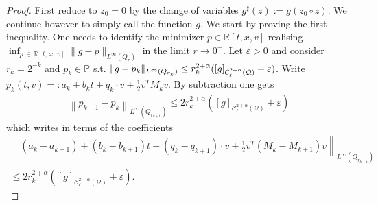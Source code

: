 \documentclass[10pt]{amsart}
\theoremstyle{definition}\newtheorem{defi}[theo]{Definition}\newtheorem{rema}[theo]{Remark}\newtheorem{exam}[theo]{Example}\newtheorem{exem}[theo]{Example}\newtheorem{nota}[theo]{Notation}
\newcommand{\R}{\mathbb{R}}
\newcommand{\bbP}{\mathbb{P}}
\newcommand{\cC}{\mathcal{C}}
\newcommand{\cQ}{\mathcal{Q}}
\newcommand*\eps{\varepsilon}
\begin{document}
\begin{proof}
First reduce to $z_0=0$ by the change of variables $g^\sharp(z) := g(z_0 \circ z)$. We continue however to simply call the function $g$. We start by proving the first inequality. One needs to identify the minimizer $p \in \R[t,x,v]$ realising $\inf_{p\,\in\,\R[t,\,x,\,v]} \|g-p \|_{L^\infty(Q_r)}$ in the limit $r \to 0^+$. Let $\eps >0$ and consider $r_k = 2^{-k}$ and $p_k \in \bbP$ s.t. $\|g-p_k \|_{L^\infty(Q_{r_k})}\linebreak\le r_k^{2+\alpha}([g]_{\cC_\ell^{2+\alpha}(\cQ)} + \eps)$. Write $p_k(t,v) =: a_k + b_k t + q_k \cdot v + \frac12 v^T M_k v$. By subtraction one gets
\begin{align*}
\left\| p_{k+1}-p_{k} \right\|_{L^\infty\left(Q_{r_{k+1}}\right)} \le 2 r_k^{2+\alpha} \left([g]_{\cC_\ell^{2+\alpha}(\cQ)}+\eps \right)
\end{align*}
which writes in terms of the coefficients
\begin{align*}
\left\| \left(a_{k}-a_{k+1}\right) + \left(b_{k} - b_{k+1}
\right) t + \left(q_{k} - q_{k+1} \right) \cdot v + \frac12 v^T
\left(M_{k} - M_{k+1} \right) v
\right\|_{L^\infty\left(Q_{r_{k+1}}\right)} \\
\le 2 r_{k}^{2+\alpha} \left([g]_{\cC_\ell^{2+\alpha}(\cQ)} + \eps \right).
\end{align*}



\end{proof}
\end{document}
